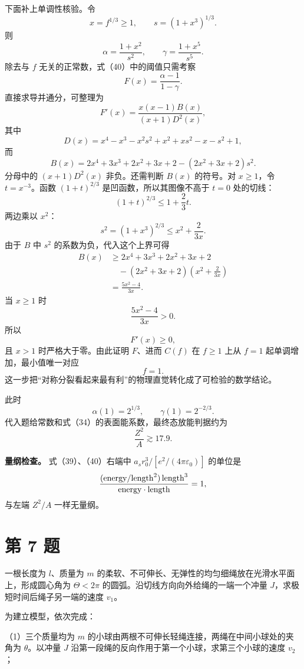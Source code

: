 \documentclass[12pt,a4paper,UTF8]{ctexart}
\begin{document}
下面补上单调性核验。令 \[
x=f^{1/3}\geqslant1,
\qquad
s=(1+x^3)^{1/3}.
\] 则 \[
\alpha=\frac{1+x^2}{s^2},
\qquad
\gamma=\frac{1+x^5}{s^5}.
\] 除去与 \(f\) 无关的正常数，式（40）中的阈值只需考察 \[
F(x)=\frac{\alpha-1}{1-\gamma}.
\] 直接求导并通分，可整理为 \[
F'(x)
=\frac{x(x-1)B(x)}
{(x+1)D^2(x)},
\] 其中 \[
D(x)
=x^4-x^3-x^2s^2+x^2+xs^2-x-s^2+1,
\] 而 \[
B(x)
=2x^4+3x^3+2x^2+3x+2
-(2x^2+3x+2)s^2.
\] 分母中的 \((x+1)D^2(x)\) 非负。还需判断 \(B(x)\) 的符号。对
\(x\geqslant1\)，令 \(t=x^{-3}\)。函数 \((1+t)^{2/3}\)
是凹函数，所以其图像不高于 \(t=0\) 处的切线： \[
(1+t)^{2/3}\leqslant1+\frac23t.
\] 两边乘以 \(x^2\)： \[
s^2=(1+x^3)^{2/3}
\leqslant x^2+\frac{2}{3x}.
\] 由于 \(B\) 中 \(s^2\) 的系数为负，代入这个上界可得 \[
\begin{aligned}
B(x)
&\geqslant
2x^4+3x^3+2x^2+3x+2\\
&\quad
-(2x^2+3x+2)
\left(x^2+\frac{2}{3x}\right)\\
&=\frac{5x^2-4}{3x}.
\end{aligned}
\] 当 \(x\geqslant1\) 时 \[
\frac{5x^2-4}{3x}>0.
\] 所以 \[
F'(x)\geqslant0,
\] 且 \(x>1\) 时严格大于零。由此证明 \(F\)、进而 \(C(f)\) 在
\(f\geqslant1\) 上从 \(f=1\) 起单调增加，最小值唯一对应 \[
\boxed{f=1}.
\] 这一步把``对称分裂看起来最有利''的物理直觉转化成了可检验的数学结论。

此时 \[
\alpha(1)=2^{1/3},\qquad
\gamma(1)=2^{-2/3}. \tag{42}
\] 代入题给常数和式（34）的表面能系数，最终态放能判据约为 \[
\boxed{
\frac{Z^2}{A}\gtrsim17.9
}. \tag{43}
\]

\textbf{量纲检查。} 式（39）、（40）右端中
\(a_sr_0^3/[e^2/(4\pi\varepsilon_0)]\) 的单位是 \[
\frac{({\rm energy}/{\rm length}^2)\,{\rm length}^3}
{{\rm energy}\cdot{\rm length}}=1,
\] 与左端 \(Z^2/A\) 一样无量纲。

\newpage

\section{第 7 题}\label{ux7b2c-7-ux9898}

一根长度为 \(l\)、质量为 \(m\)
的柔软、不可伸长、无弹性的均匀细绳放在光滑水平面上，形成圆心角为
\(\Theta<2\pi\) 的圆弧。沿切线方向向外给绳的一端一个冲量
\(J\)，求极短时间后绳子另一端的速度 \(v_1\)。

为建立模型，依次完成：

（1）三个质量均为 \(m\)
的小球由两根不可伸长轻绳连接，两绳在中间小球处的夹角为
\(\theta\)。以冲量 \(J\)
沿第一段绳的反向作用于第一个小球，求第三个小球的速度 \(v_2\)；
\end{document}
